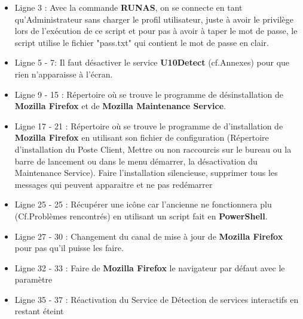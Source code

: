 \documentclass[11pt,a4paper,oneside]{article}
\begin{document}
\begin{itemize}
	\item Ligne 3 : Avec la commande \textbf{RUNAS}, on se connecte en tant qu'Administrateur sans charger le profil utilisateur, juste à avoir le privilège lors de l'exécution de ce script et pour pas à avoir à taper le mot de passe, le script utilise le fichier "pass.txt" qui contient le mot de passe en clair.
	\item Ligne 5 - 7: Il faut désactiver le service \textbf{U10Detect} (cf.Annexes) pour que rien n'apparaisse à l'écran. 
	\item Ligne 9 - 15 : Répertoire où se trouve le programme de désinstallation de \textbf{Mozilla Firefox} et de \textbf{Mozilla Maintenance Service}.
	\item Ligne 17 - 21 : Répertoire où se trouve le programme de d'installation de \textbf{Mozilla Firefox} en utilisant son fichier de configuration (Répertoire d'installation du Poste Client, Mettre ou non raccourcis sur le bureau ou la barre de lancement ou dans le menu démarrer, la désactivation du Maintenance Service). Faire l'installation silencieuse, supprimer tous les messages qui peuvent apparaitre et ne pas redémarrer
	\item Ligne 25 - 25 : Récupérer une icône car l'ancienne ne fonctionnera plu (Cf.Problèmes rencontrés) en utilisant un script fait en \textbf{PowerShell}.
	\item Ligne 27 - 30 : Changement du canal de mise à jour de \textbf{Mozilla Firefox} pour pas qu'il puisse les faire.
	\item Ligne 32 - 33 : Faire de \textbf{Mozilla Firefox} le navigateur par défaut avec le paramètre
	\item Ligne 35 - 37 : Réactivation du Service de Détection de services interactifs en restant éteint
\end{itemize}
\newpage
\end{document}
